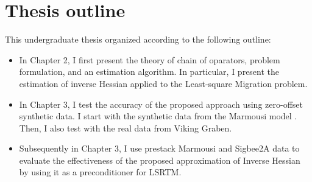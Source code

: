 \section{Thesis outline}

This undergraduate thesis organized according to the following outline:
 
\begin{itemize}

\item In Chapter 2, I first present the theory of chain of oparators, problem formulation, and an estimation algorithm. In particular, I present the estimation of inverse Hessian applied to the Least-square Migration problem. 

\item In Chapter 3, I test the accuracy of the proposed approach using zero-offset synthetic data. I start with the synthetic data from the Marmousi model \cite[]{versteeg1994}. Then, I also test with the real data from Viking Graben. 

\item Subsequently in Chapter 3, I use prestack Marmousi and Sigbee2A data to evaluate the effectiveness of the proposed approximation of Inverse Hessian by using it as a preconditioner for LSRTM.
\end{itemize}

